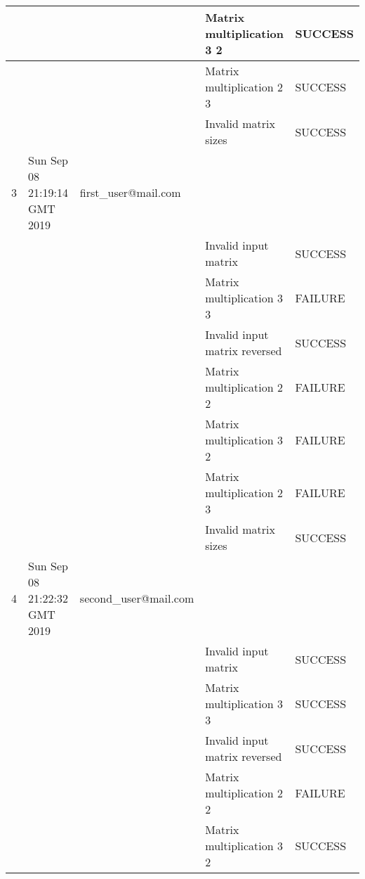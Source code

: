 \begin{table}[H]
{\begin{tabular}{|l|l|l|l|l|}
    &                              &                                 & Matrix multiplication 3 2     & SUCCESS \\ \hline
    &                              &                                 & Matrix multiplication 2 3     & SUCCESS \\ \hline
    &                              &                                 & Invalid matrix sizes          & SUCCESS \\ \hline
    3     & Sun Sep 08 21:19:14 GMT 2019 & first\_user@mail.com &                               &         \\ \hline
    &                              &                                 & Invalid input matrix          & SUCCESS \\ \hline
    &                              &                                 & Matrix multiplication 3 3     & FAILURE \\ \hline
    &                              &                                 & Invalid input matrix reversed & SUCCESS \\ \hline
    &                              &                                 & Matrix multiplication 2 2     & FAILURE \\ \hline
    &                              &                                 & Matrix multiplication 3 2     & FAILURE \\ \hline
    &                              &                                 & Matrix multiplication 2 3     & FAILURE \\ \hline
    &                              &                                 & Invalid matrix sizes          & SUCCESS \\ \hline
    4     & Sun Sep 08 21:22:32 GMT 2019 & second\_user@mail.com               &                               &         \\ \hline
    &                              &                                 & Invalid input matrix          & SUCCESS \\ \hline
    &                              &                                 & Matrix multiplication 3 3     & SUCCESS \\ \hline
    &                              &                                 & Invalid input matrix reversed & SUCCESS \\ \hline
    &                              &                                 & Matrix multiplication 2 2     & FAILURE \\ \hline
    &                              &                                 & Matrix multiplication 3 2     & SUCCESS \\ \hline

\end{tabular}}
\end{table}
